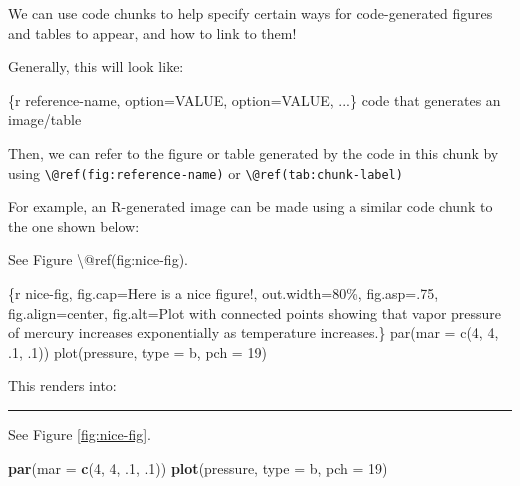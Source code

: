 \documentclass[
]{book}
\newenvironment{Shaded}{\begin{snugshade}}{\end{snugshade}}
\newcommand{\AttributeTok}[1]{\textcolor[rgb]{0.13,0.29,0.53}{#1}}
\newcommand{\DecValTok}[1]{\textcolor[rgb]{0.00,0.00,0.81}{#1}}
\newcommand{\FunctionTok}[1]{\textcolor[rgb]{0.13,0.29,0.53}{\textbf{#1}}}
\newcommand{\NormalTok}[1]{#1}
\newcommand{\StringTok}[1]{\textcolor[rgb]{0.31,0.60,0.02}{#1}}
\theoremstyle{definition}
\theoremstyle{definition}
\theoremstyle{definition}
\theoremstyle{definition}
\theoremstyle{remark}
\begin{document}
We can use code chunks to help specify certain ways for code-generated figures and tables to appear, and how to link to them!

Generally, this will look like:

\begin{Shaded}
\begin{Highlighting}[]
\NormalTok{\textasciigrave{}\textasciigrave{}\textasciigrave{}\{r reference{-}name, option=VALUE, option=VALUE, ...\}}
\NormalTok{code that generates an image/table}
\NormalTok{\textasciigrave{}\textasciigrave{}\textasciigrave{}}
\end{Highlighting}
\end{Shaded}

Then, we can refer to the figure or table generated by the code in this chunk by using \texttt{\textbackslash{}@ref(fig:reference-name)} or \texttt{\textbackslash{}@ref(tab:chunk-label)}

For example, an R-generated image can be made using a similar code chunk to the one shown below:

\begin{Shaded}
\begin{Highlighting}[]
\NormalTok{See Figure \textbackslash{}@ref(fig:nice{-}fig).}

\NormalTok{\textasciigrave{}\textasciigrave{}\textasciigrave{}\{r nice{-}fig, fig.cap=\textquotesingle{}Here is a nice figure!\textquotesingle{}, out.width=\textquotesingle{}80\%\textquotesingle{}, fig.asp=.75, fig.align=\textquotesingle{}center\textquotesingle{}, fig.alt=\textquotesingle{}Plot with connected points showing that vapor pressure of mercury increases exponentially as temperature increases.\textquotesingle{}\}}
\NormalTok{par(mar = c(4, 4, .1, .1))}
\NormalTok{plot(pressure, type = \textquotesingle{}b\textquotesingle{}, pch = 19)}
\NormalTok{\textasciigrave{}\textasciigrave{}\textasciigrave{}}
\end{Highlighting}
\end{Shaded}

This renders into:

\begin{center}\rule{0.5\linewidth}{0.5pt}\end{center}

See Figure \ref{fig:nice-fig}.

\begin{Shaded}
\begin{Highlighting}[]
\FunctionTok{par}\NormalTok{(}\AttributeTok{mar =} \FunctionTok{c}\NormalTok{(}\DecValTok{4}\NormalTok{, }\DecValTok{4}\NormalTok{, .}\DecValTok{1}\NormalTok{, .}\DecValTok{1}\NormalTok{))}
\FunctionTok{plot}\NormalTok{(pressure, }\AttributeTok{type =} \StringTok{\textquotesingle{}b\textquotesingle{}}\NormalTok{, }\AttributeTok{pch =} \DecValTok{19}\NormalTok{)}
\end{Highlighting}
\end{Shaded}
\end{document}
